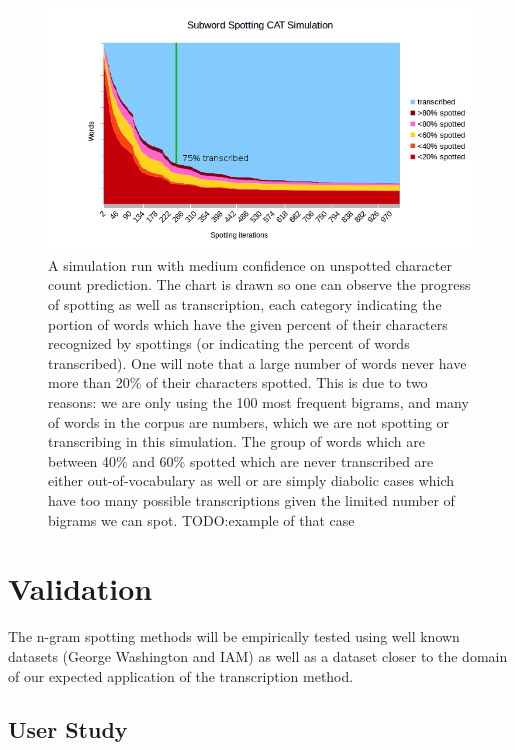 \documentclass[ms]{byuprop}
\begin{document}
\begin{figure}[h]
    \centering
    \includegraphics[width=1.0\textwidth]{simulationGraph_line}
    \caption{A simulation run with medium confidence on unspotted character count prediction. The chart is drawn so one can observe the progress of spotting as well as transcription, each category indicating the portion of words which have the given percent of their characters recognized by spottings (or indicating the percent of words transcribed). One will note that a large number of words never have more than 20\% of their characters spotted. This is due to two reasons: we are only using the 100 most frequent bigrams, and many of words in the corpus are numbers, which we are not spotting or transcribing in this simulation. The group of words which are between 40\% and 60\% spotted which are never transcribed are either out-of-vocabulary as well or are simply diabolic cases which have too many possible transcriptions given the limited number of bigrams we can spot. TODO:example of that case}
    \label{fig:fullSim}
\end{figure}

\section{Validation}
The n-gram spotting methods will be empirically tested using well known datasets (George Washington\cite{GW} and IAM\cite{IAM}) as well as a dataset closer to the domain of our expected application of the transcription method.

\subsection{User Study}
\end{document}
